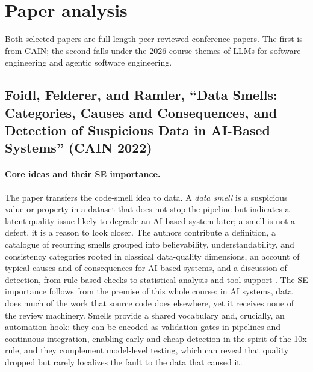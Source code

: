 \documentclass[11pt,a4paper]{article}
\begin{document}
\section{Paper analysis}

Both selected papers are full-length peer-reviewed conference papers. The first is from CAIN; the second falls under the 2026 course themes of LLMs for software engineering and agentic software engineering.

\subsection{Foidl, Felderer, and Ramler, ``Data Smells: Categories, Causes and Consequences, and Detection of Suspicious Data in AI-Based Systems'' (CAIN 2022)}

\paragraph{Core ideas and their SE importance.}
The paper transfers the code-smell idea to data. A \emph{data smell} is a suspicious value or property in a dataset that does not stop the pipeline but indicates a latent quality issue likely to degrade an AI-based system later; a smell is not a defect, it is a reason to look closer. The authors contribute a definition, a catalogue of recurring smells grouped into believability, understandability, and consistency categories rooted in classical data-quality dimensions, an account of typical causes and of consequences for AI-based systems, and a discussion of detection, from rule-based checks to statistical analysis and tool support \cite{foidl}. The SE importance follows from the premise of this whole course: in AI systems, data does much of the work that source code does elsewhere, yet it receives none of the review machinery. Smells provide a shared vocabulary and, crucially, an automation hook: they can be encoded as validation gates in pipelines and continuous integration, enabling early and cheap detection in the spirit of the 10x rule, and they complement model-level testing, which can reveal that quality dropped but rarely localizes the fault to the data that caused it.

\vspace{-2mm}
\end{document}
